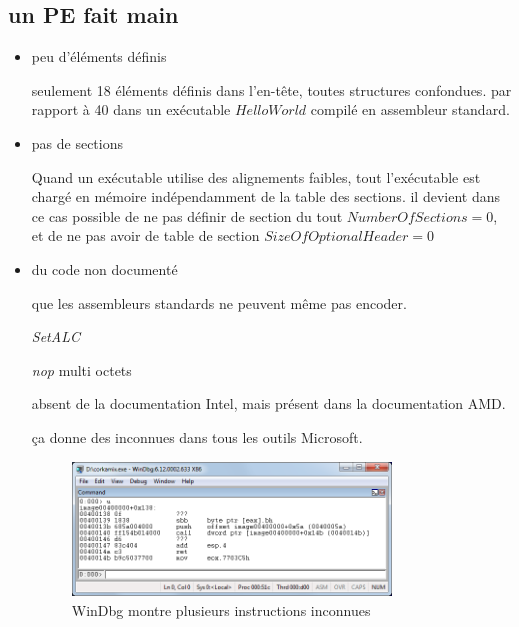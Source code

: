 \subsection{un PE fait main}
\begin{itemize}
\item peu d'éléments définis

seulement 18 éléments définis dans l'en-tête, toutes structures confondues. par rapport à 40 dans un exécutable $Hello World$ compilé en assembleur standard.

\item pas de sections

Quand un exécutable utilise des alignements faibles, tout l'exécutable est chargé en mémoire indépendamment de la table des sections. il devient dans ce cas possible de ne pas définir de section du tout $NumberOfSections = 0$, et de ne pas avoir de table de section $SizeOfOptionalHeader = 0$

\item du code non documenté

que les assembleurs standards ne peuvent même pas encoder.

{\em SetALC}

{\em nop} multi octets

absent de la documentation Intel, mais présent dans la documentation AMD.

ça donne des inconnues dans tous les outils Microsoft.
\begin{figure}[ht]
  \centering
  \includegraphics[width=0.8\textwidth]{albertini/img/corkamix_windbg}
  \caption{WinDbg montre plusieurs instructions inconnues}
  \label{fig:albertini:corkamix_windbg}
\end{figure}


\end{itemize}
